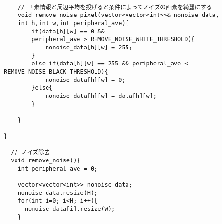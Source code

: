   \begin{lstlisting}[basicstyle=\ttfamily\footnotesize, frame=single]

  	// 画素情報と周辺平均を投げると条件によってノイズの画素を綺麗にする
	void remove_noise_pixel(vector<vector<int>>& nonoise_data,
    int h,int w,int peripheral_ave){
		if(data[h][w] == 0 && 
        peripheral_ave > REMOVE_NOISE_WHITE_THRESHOLD){
			nonoise_data[h][w] = 255;
		}
		else if(data[h][w] == 255 && peripheral_ave < REMOVE_NOISE_BLACK_THRESHOLD){
			nonoise_data[h][w] = 0;
		}else{
			nonoise_data[h][w] = data[h][w];
		}
	
	}

}

  // ノイズ除去
  void remove_noise(){
    int peripheral_ave = 0;

    vector<vector<int>> nonoise_data;
    nonoise_data.resize(H);
    for(int i=0; i<H; i++){
      nonoise_data[i].resize(W);
    }
    

\end{lstlisting}
